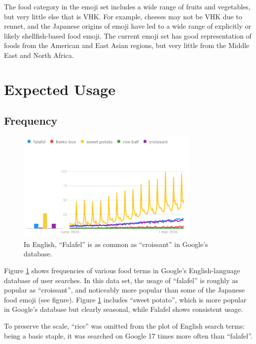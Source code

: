 \documentclass[a4paper,10pt]{article}
\begin{document}
The food category in the emoji set includes a wide range of fruits and vegetables, but
very little else that is VHK. For example, cheeses may not be VHK due to rennet, and the
Japanese origins of emoji have led to a wide range of explicitly or likely
shellfish-based food emoji. The current emoji set has good representation of foods
from the American and East Asian regions, but very little from the Middle East and
North Africa.

\section{Expected Usage}

\subsection{Frequency}

\begin{figure}
\begin{center}
\includegraphics[width=3.5in]{trends.png}
\end{center}
\caption{In English, ``Falafel'' is as common as ``croissant'' in Google's database.}
\label{engplot}
\end{figure}


Figure \ref{engplot} shows frequencies of various food terms in Google's English-language
database of user searches.  In this data set, the usage of ``falafel'' is roughly as popular as
``croissant'', and noticeably more popular than some of the Japanese food emoji
(see figure).  Figure \ref{engplot} includes ``sweet potato'', which is more popular
in Google's database but clearly seasonal, while Falafel shows consistent usage.

To preserve the scale, ``rice'' was omitted from the plot of English search terms:
being a basic staple, it was searched on Google 17 times more often than ``falafel''.
\end{document}
